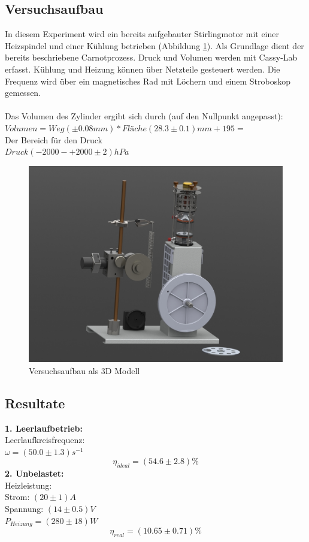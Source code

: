 \documentclass[12pt,a4paper]{article}
\begin{document}
\begin{multicols}{2}
\subsection{Versuchsaufbau}
In diesem Experiment wird ein bereits aufgebauter Stirlingmotor mit einer Heizspindel und einer Kühlung betrieben (Abbildung  \ref{fig:stirlingMotor_3D}). Als Grundlage dient der bereits beschriebene Carnotprozess. Druck und Volumen werden mit Cassy-Lab erfasst. Kühlung und Heizung können über Netzteile gesteuert werden. Die Frequenz wird über ein magnetisches Rad mit Löchern und einem Stroboskop gemessen.\\
\\
Das Volumen des Zylinder ergibt sich durch (auf den Nullpunkt angepasst):\\
$Volumen = Weg (\pm 0.08mm) * Fläche (28.3 \pm 0.1)mm + 195 = $\\ %
Der Bereich für den Druck\\
$Druck (-2000 - +2000 \pm 2) hPa$\\

\begin{figure}[H]
	\centering
	\includegraphics[scale=0.20]{./data/3D-Model/PS9-model_neutral01.JPG}
	\caption{Versuchsaufbau als 3D Modell}
	\label{fig:stirlingMotor_3D}
\end{figure}

\subsection{Resultate}
\textbf{1. Leerlaufbetrieb:}\\
Leerlaufkreisfrequenz:\\
$\omega=(50.0 \pm 1.3)s^{-1}$
$$\eta_{ideal}=(54.6 \pm 2.8)\%$$
\textbf{2. Unbelastet:}\\
Heizleistung:\\
Strom: $(20 \pm 1) A$\\
Spannung: $(14 \pm 0.5) V$\\
$P_{Heizung}=(280 \pm 18)W$\\
$$\eta_{real}=(10.65 \pm 0.71)\%$$\\


\end{multicols}
\end{document}
